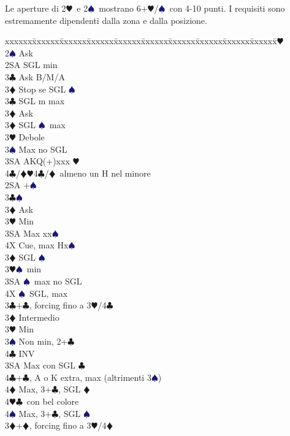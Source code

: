 \documentclass[a4paper,italian]{article}
\newcommand{\BC}{\textcolor{OliveGreen}{$\clubsuit$}}
\newcommand{\BD}{\textcolor{RedOrange}{$\vardiamondsuit$}}
\newcommand{\BH}{\textcolor{Red2}{$\varheartsuit${}}}
\newcommand{\BS}{\textcolor{MidnightBlue}{$\spadesuit${}}}
\newenvironment{bidtable}
{\begin{tabbing}

    xxxxxx\=xxxxxx\=xxxxxx\=xxxxxx\=xxxxxx\=xxxxxx\=xxxxxx\=xxxxxx\=xxxxxx\=xxxxxx\=\kill}
{\end{tabbing} }%
\begin{document}
\begin{multicols*}{2}
    Le aperture di 2\BH\ e 2\BS\ mostrano 6+\BH/\BS\ con 4-10 punti. I requisiti sono estremamente dipendenti
    dalla zona e dalla posizione.
    \begin{bidtable}
        2\BH\+\\
        2\BS \> Ask\+\\
        2SA \> SGL min\+\\
        3\BC \> Ask B/M/A\\
        3\BD \> Stop se SGL \BS \-\\
        3\BC \> SGL m max\+\\
        3\BD \> Ask\-\\
        3\BD \> SGL \BS\ max\\
        3\BH \> Debole\\
        3\BS \> Max no SGL\\
        3SA \> AKQ(+)xxx \BH\\
        4\BC/\BD {}\BH 4\BC /\BD\ almeno un H nel minore\-\\
        2SA +\BS \+\\
        3\BC {}\BS \+\\
        3\BD \> Ask\+\\
        3\BH \> Min\\
        3SA \> Max xx\BS \\
        4X \> Cue, max Hx\BS\-\-\\
        3\BD \> SGL \BS \\
        3\BH {}\BS\ min\\
        3SA \BS\ max no SGL\\
        4X \BS\ SGL, max\-\\
        3\BC {}+\BC, forcing fino a 3\BH/4\BC\+\\
        3\BD \> Intermedio\\
        3\BH\> Min\\
        3\BS\> Non min, 2+\BC\+\\
        4\BC\> INV\-\\
        3SA\> Max con SGL \BC\\
        4\BC{}+\BC, A o K extra, max (altrimenti 3\BS)\\
        4\BD\> Max, 3+\BC, SGL \BD\\
        4\BH{}\BC\ con bel colore\\
        4\BS\> Max, 3+\BC, SGL \BS\-\\
        3\BD {}+\BD, forcing fino a 3\BH/4\BD\+\\

\end{bidtable}
\end{multicols*}
\end{document}
